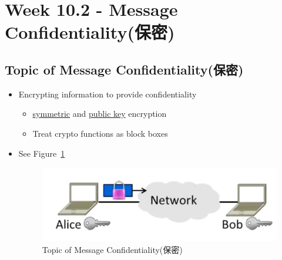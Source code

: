 \documentclass[12pt]{ctexart}   %
\begin{document}
\section{Week 10.2 - Message Confidentiality(保密)}
	\subsection{Topic of Message Confidentiality(保密)}
	\begin{itemize}
		\item Encrypting information to provide confidentiality
		\begin{itemize}
			\item \underline{symmetric} and \underline{public key} encryption
			\item Treat crypto functions as block boxes
		\end{itemize}
		\item See Figure~\ref{fig:10-2-1}
		  
		\begin{figure}[h!] %
		\centering
		\includegraphics[scale=0.7]{images/10-2-1}
		\caption{Topic of Message Confidentiality(保密)}
		\label{fig:10-2-1}
		\end{figure}
	\end{itemize}
\end{document}
